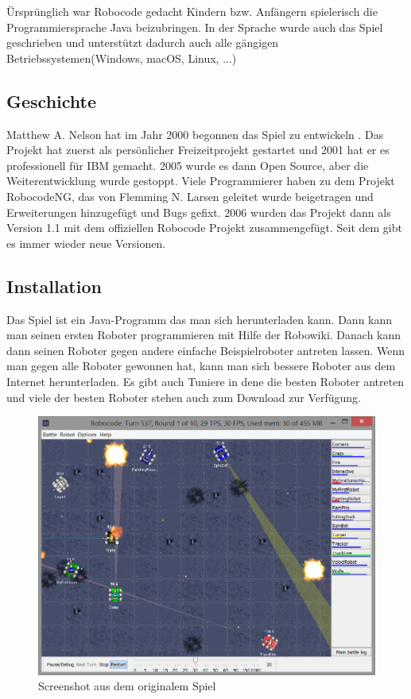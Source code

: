 \documentclass{article}
\begin{document}
Ürsprünglich war Robocode gedacht Kindern bzw. Anfängern spielerisch die Programmiersprache Java beizubringen. In der Sprache wurde auch das Spiel geschrieben und unterstützt dadurch auch alle gängigen Betriebssystemen(Windows, macOS, Linux, ...)

\subsection{Geschichte}
Matthew A. Nelson hat im Jahr 2000 begonnen das Spiel zu entwickeln . Das Projekt hat zuerst als persönlicher Freizeitprojekt gestartet und 2001 hat er es professionell für IBM gemacht. 2005 wurde es dann Open Source, aber die  Weiterentwicklung wurde gestoppt. Viele Programmierer haben zu dem Projekt RobocodeNG, das von Flemming N. Larsen geleitet wurde beigetragen und Erweiterungen hinzugefügt und Bugs gefixt. 2006 wurden das Projekt dann als Version 1.1 mit dem offiziellen Robocode Projekt zusammengefügt. Seit dem gibt es immer wieder neue Versionen.

\subsection{Installation}

Das Spiel ist ein Java-Programm das man sich herunterladen kann. Dann kann man seinen ersten Roboter programmieren mit Hilfe der Robowiki. Danach kann dann seinen Roboter gegen andere einfache Beispielroboter antreten lassen. Wenn man gegen alle Roboter gewonnen hat, kann man sich bessere Roboter aus dem Internet herunterladen. Es gibt auch Tuniere in dene die besten Roboter antreten und viele der besten Roboter stehen auch zum Download zur Verfügung.

\begin{figure}[h]
    \centering
    \includegraphics[width=\textwidth]{Robocodegame}
    \caption{Screenshot aus dem originalem Spiel}
\end{figure}
\end{document}
